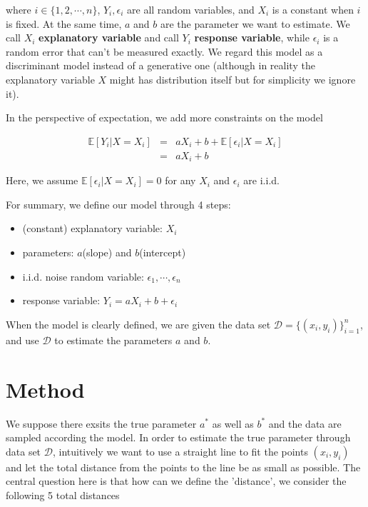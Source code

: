 \documentclass[twoside]{article}
\begin{document}
where $i \in \{1, 2,\cdots, n\}$, $Y_i, \epsilon_i$ are all random variables, and $X_i$ is a constant when $i$ is fixed. At the same time, $a$ and $b$ are the parameter we want to estimate. We call $X_i$ \textbf{explanatory variable} and call $Y_i$ \textbf{response variable}, while $\epsilon_i$ is a random error that can't be measured exactly.
We regard this model as a discriminant model instead of a generative one (although in reality the explanatory variable $X$ might has distribution itself but for simplicity we ignore it).

In the perspective of expectation, we add more constraints on the model

\begin{eqnarray}
  \mathbb{E}[Y_i\lvert X=X_i] &=& a X_i + b + \mathbb{E}[\epsilon_i\lvert X=X_i] \\
  &=& a X_i + b
\end{eqnarray}

Here, we assume $\mathbb{E}[\epsilon_i\lvert X=X_i]=0$ for any $X_i$ and $\epsilon_i$ are i.i.d.

For summary, we define our model through 4 steps:

\begin{itemize}
  \item (constant) explanatory variable: $X_i$
  \item parameters: $a$(slope) and $b$(intercept)
  \item i.i.d. noise random variable: $\epsilon_1, \cdots, \epsilon_n$
  \item response variable: $Y_i = a X_i + b + \epsilon_i$
\end{itemize}

When the model is clearly defined, we are given the data set $\mathcal{D}=\{(x_i,y_i)\}_{i=1}^n$, and use $\mathcal{D}$ to estimate the parameters $a$ and $b$.

\section{Method}

We suppose there exsits the true parameter $a^*$ as well as $b^*$ and the data are sampled according the model. In order to estimate the true parameter through data set $\mathcal{D}$, intuitively we want to use a straight line to fit the points $(x_i, y_i)$ and let the total distance from the points to the line be as small as possible. The central question here is that how can we define the 'distance', we consider the following 5 total distances
\end{document}
